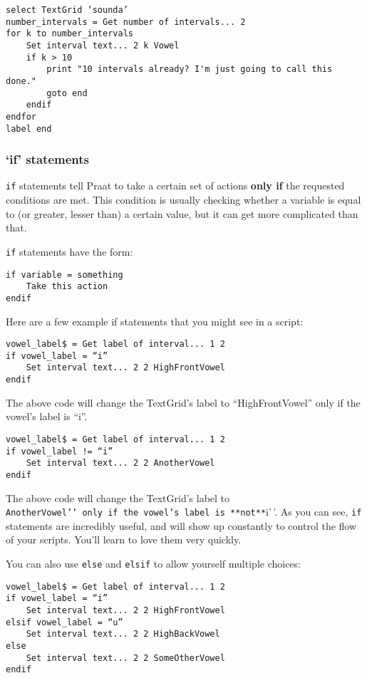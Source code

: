\documentclass[11pt]{article}
\begin{document}
\begin{verbatim} 
select TextGrid ‘sounda’
number_intervals = Get number of intervals... 2
for k to number_intervals
    Set interval text... 2 k Vowel
    if k > 10
        print "10 intervals already? I'm just going to call this done."
        goto end
    endif
endfor
label end
\end{verbatim}

\hypertarget{if-statements}{%
\subsubsection{`if' statements}\label{if-statements}}

\texttt{if} statements tell Praat to take a certain set of actions
\textbf{only if} the requested conditions are met. This condition is
usually checking whether a variable is equal to (or greater, lesser
than) a certain value, but it can get more complicated than that.

\texttt{if} statements have the form:

\begin{verbatim}
if variable = something
    Take this action
endif
\end{verbatim}

Here are a few example if statements that you might see in a script:

\begin{verbatim} 
vowel_label$ = Get label of interval... 1 2
if vowel_label = “i”
    Set interval text... 2 2 HighFrontVowel
endif
\end{verbatim}

The above code will change the TextGrid's label to ``HighFrontVowel''
only if the vowel's label is ``i''.

\begin{verbatim}
vowel_label$ = Get label of interval... 1 2
if vowel_label != “i”
    Set interval text... 2 2 AnotherVowel
endif
\end{verbatim}

The above code will change the TextGrid's label to
\texttt{AnotherVowel’’\ only\ if\ the\ vowel’s\ label\ is\ **not**}i'\,'.
As you can see, \texttt{if} statements are incredibly useful, and will
show up constantly to control the flow of your scripts. You'll learn to
love them very quickly.

You can also use \texttt{else} and \texttt{elsif} to allow yourself
multiple choices:

\begin{verbatim}
vowel_label$ = Get label of interval... 1 2
if vowel_label = “i”
    Set interval text... 2 2 HighFrontVowel
elsif vowel_label = “u”
    Set interval text... 2 2 HighBackVowel
else
    Set interval text... 2 2 SomeOtherVowel
endif
\end{verbatim}
\end{document}
